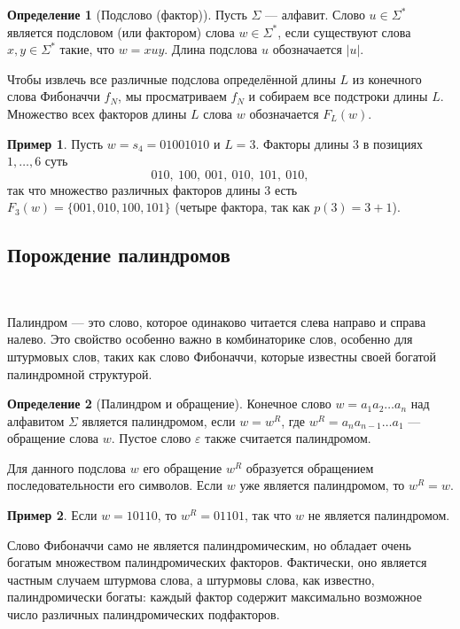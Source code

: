 \documentclass[a4paper,14pt]{extreport}
\theoremstyle{plain}
\theoremstyle{definition}
\newtheorem{definition}{Определение}[section]
\newtheorem{example}{Пример}
\theoremstyle{remark}
\begin{document}
\begin{definition}[Подслово (фактор)]
	Пусть $\Sigma$ --- алфавит. Слово $u \in \Sigma^*$ является подсловом (или фактором) слова $w \in \Sigma^*$, если существуют слова $x,y \in \Sigma^*$ такие, что $w = xuy$. Длина подслова $u$ обозначается $|u|$.
\end{definition}

Чтобы извлечь все различные подслова определённой длины $L$ из конечного слова Фибоначчи $f_N$, мы просматриваем $f_N$ и собираем все подстроки длины $L$. Множество всех факторов длины $L$ слова $w$ обозначается $F_L(w)$.

\begin{example}
	Пусть $w=s_4=01001010$ и $L=3$. Факторы длины $3$ в позициях $1,\dots,6$ суть
	\begin{equation}
		010,\ 100,\ 001,\ 010,\ 101,\ 010,
	\end{equation}
	так что множество различных факторов длины $3$ есть $F_3(w)=\{001,010,100,101\}$ (четыре фактора, так как $p(3)=3+1$).
\end{example}
\subsection{Порождение палиндромов}~\label{sec3.3.2}

Палиндром --- это слово, которое одинаково читается слева направо и справа налево. Это свойство особенно важно в комбинаторике слов, особенно для штурмовых слов, таких как слово Фибоначчи, которые известны своей богатой палиндромной структурой.

\begin{definition}[Палиндром и обращение]
	Конечное слово $w = a_1 a_2 \ldots a_n$ над алфавитом $\Sigma$ является палиндромом, если $w = w^R$, где $w^R = a_n a_{n-1} \ldots a_1$ --- обращение слова $w$. Пустое слово $\varepsilon$ также считается палиндромом.
\end{definition}

Для данного подслова $w$ его обращение $w^R$ образуется обращением последовательности его символов. Если $w$ уже является палиндромом, то $w^R = w$.

\begin{example}
	Если $w = 10110$, то $w^R = 01101$, так что $w$ не является палиндромом.
\end{example}

Слово Фибоначчи само не является палиндромическим, но обладает очень богатым множеством палиндромических факторов. Фактически, оно является частным случаем штурмова слова, а штурмовы слова, как известно, палиндромически богаты: каждый фактор содержит максимально возможное число различных палиндромических подфакторов.
\end{document}
